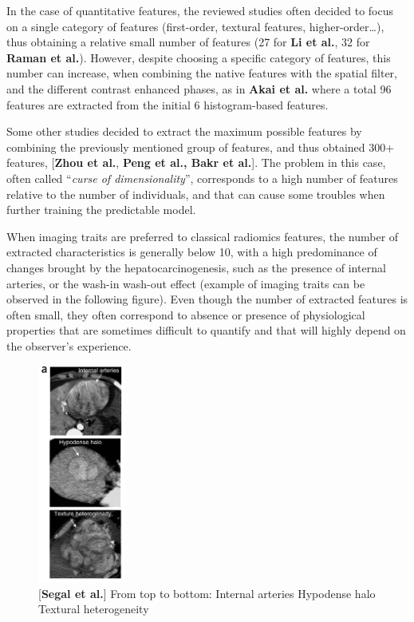 \documentclass[]{article}
\begin{document}
In the case of quantitative features, the reviewed studies often decided
to focus on a single category of features (first-order, textural
features, higher-order\ldots{}), thus obtaining a relative small number
of features (27 for \textbf{Li et al.}, 32 for \textbf{Raman et al.}).
However, despite choosing a specific category of features, this number
can increase, when combining the native features with the spatial
filter, and the different contrast enhanced phases, as in \textbf{Akai
et al.} where a total 96 features are extracted from the initial 6
histogram-based features.

Some other studies decided to extract the maximum possible features by
combining the previously mentioned group of features, and thus obtained
300+ features, {[}\textbf{Zhou et al.}, \textbf{Peng et al., Bakr et
al.}{]}. The problem in this case, often called ``\emph{curse of
dimensionality}'', corresponds to a high number of features relative to
the number of individuals, and that can cause some troubles when further
training the predictable model.

When imaging traits are preferred to classical radiomics features, the
number of extracted characteristics is generally below 10, with a high
predominance of changes brought by the hepatocarcinogenesis, such as the
presence of internal arteries, or the wash-in wash-out effect (example
of imaging traits can be observed in the following figure). Even though
the number of extracted features is often small, they often correspond
to absence or presence of physiological properties that are sometimes
difficult to quantify and that will highly depend on the observer's
experience.

\begin{figure}[ht!]
\centering
\includegraphics[width=1.13125in,height=2.82813in]{./images/image3.png}
\caption{{[}\textbf{Segal et al.}{]}
From top to bottom:
Internal arteries
Hypodense halo
Textural heterogeneity}

\end{figure}
\end{document}
